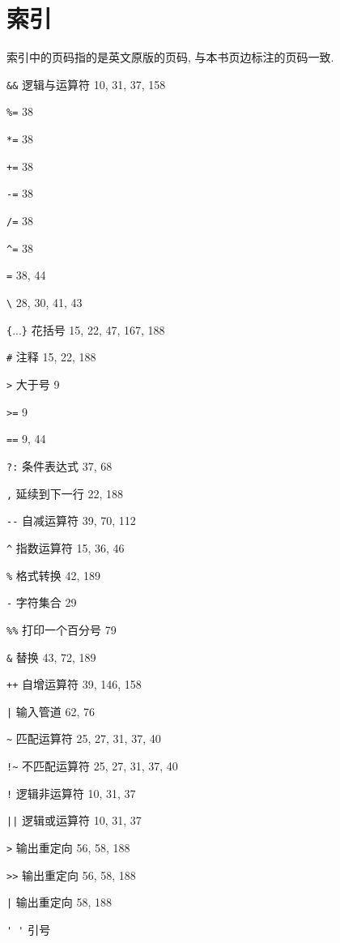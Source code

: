 \chapter{索引}
\label{chap:index}

索引中的页码指的是英文原版的页码, 与本书页边标注的页码一致.

\begin{multicols}{2}

\verb'&&' 逻辑与运算符 10, 31, 37, 158

\verb'%=' 38

\verb'*=' 38 

\verb'+=' 38

\verb'-=' 38

\verb'/=' 38

\verb'^=' 38 

\verb'=' 38, 44

\verb'\' 28, 30, 41, 43

\verb'{'...\verb'}' 花括号 15, 22, 47, 167, 188

\verb'#' 注释 15, 22, 188 

\verb'>' 大于号 9

\verb'>=' 9

\verb'==' 9, 44 

\verb'?:' 条件表达式 37, 68 

\verb',' 延续到下一行 22, 188 

\verb'--' 自减运算符 39, 70, 112

\verb'^' 指数运算符 15, 36, 46

\verb'%' 格式转换 42, 189

\verb'-' 字符集合 29

\verb'%%' 打印一个百分号 79

\verb'&' 替换 43, 72, 189

\verb'++' 自增运算符 39, 146, 158

\verb'|' 输入管道 62, 76

\verb'~' 匹配运算符 25, 27, 31, 37, 40 

\verb'!~' 不匹配运算符 25, 27, 31, 37, 40

\verb'!' 逻辑非运算符 10, 31, 37

\verb'||' 逻辑或运算符 10, 31, 37 

\verb'>' 输出重定向 56, 58, 188

\verb'>>' 输出重定向 56, 58, 188

\verb'|' 输出重定向 58, 188 

\verb"' '" 引号


\end{multicols}
